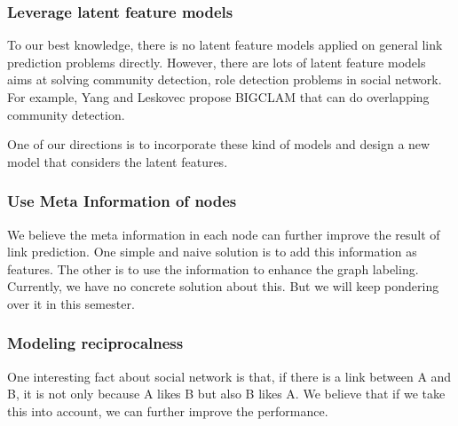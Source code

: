 \documentclass[paper=letter, fontsize=12pt]{scrartcl} %
\begin{document}
\subsubsection {Leverage latent feature models}
To our best knowledge, there is no latent feature models applied on general link prediction problems directly. However, there are lots of latent feature models aims at solving community detection, role detection problems in social network. For example, Yang and Leskovec \cite{bigclam} propose BIGCLAM that can do overlapping community detection. 

One of our directions is to incorporate these kind of models and design a new model that considers the latent features. 

\subsubsection {Use Meta Information of nodes}
We believe the meta information in each node can further improve the result of link prediction. One simple and naive solution is to add this information as features. The other is to use the information to enhance the graph labeling. Currently, we have no concrete solution about this. But we will keep pondering over it in this semester.

\subsubsection {Modeling reciprocalness}
One interesting fact about social network is that, if there is a link between A and B, it is not only because A likes B but also B likes A. We believe that if we take this into account, we can further improve the performance.





\end{document}
